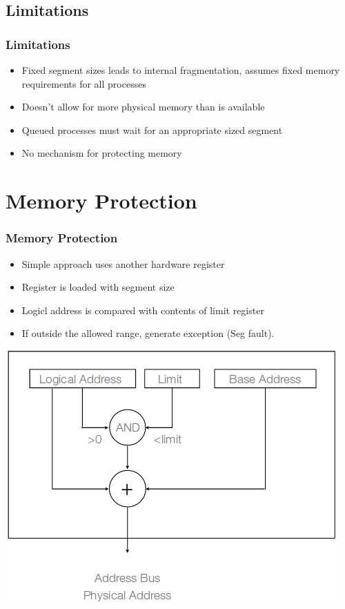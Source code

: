\documentclass{beamer}
\begin{document}
\subsection{Limitations}
\begin{frame}
\frametitle{Limitations}
\begin{itemize}
\item Fixed segment sizes leads to internal fragmentation, assumes fixed memory requirements for all processes
\item Doesn't allow for more physical memory than is available
\item Queued processes must wait for an appropriate sized segment
\item No mechanism for protecting memory
\end{itemize}
\end{frame}
\section{Memory Protection}
\begin{frame}
\frametitle{Memory Protection}
\begin{itemize}
\item Simple approach uses another hardware register
\item Register is loaded with segment size
\item Logicl address is compared with contents of limit register
\item If outside the allowed range, generate exception (Seg fault).
\end{itemize}
\includegraphics[scale=0.35]{lim.png}
\end{frame}
\end{document}
